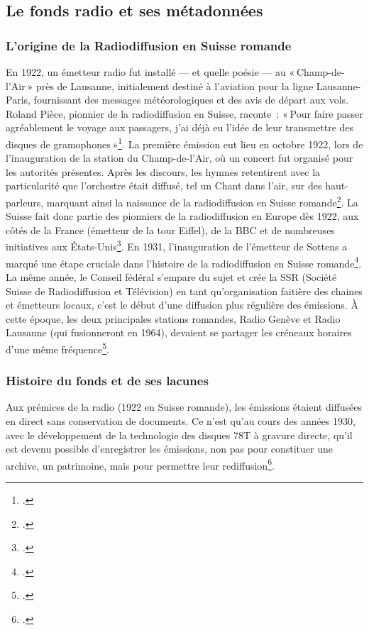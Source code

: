\subsection{Le fonds radio et ses métadonnées}
\subsubsection{L'origine de la Radiodiffusion en Suisse romande}

En 1922, un émetteur radio fut installé — et quelle poésie — au « Champ-de-l’Air » près de Lausanne, initialement destiné à l’aviation pour la ligne Lausanne-Paris, fournissant des messages météorologiques et des avis de départ aux vols. Roland Pièce, pionnier de la radiodiffusion en Suisse, raconte : « Pour faire passer agréablement le voyage aux passagers, j’ai déjà eu l’idée de leur transmettre des disques de gramophones »\footcite{1939}. La première émission eut lieu en octobre 1922, lors de l’inauguration de la station du Champ-de-l’Air, où un concert fut organisé pour les autorités présentes. Après les discours, les hymnes retentirent avec la particularité que l’orchestre était diffusé, tel un Chant dans l’air, sur des haut-parleurs, marquant ainsi la naissance de la radiodiffusion en Suisse romande\footcite{1939}. La Suisse fait donc partie des pionniers de la radiodiffusion en Europe dès 1922, aux côtés de la France (émetteur de la tour Eiffel), de la BBC et de nombreuses initiatives aux États-Unis\footcite{2022a}. 
En 1931, l’inauguration de l’émetteur de Sottens a marqué une étape cruciale dans l’histoire de la radiodiffusion en Suisse romande\footcite{zotero-256}. La même année, le Conseil fédéral s’empare du sujet et crée la SSR (Société Suisse de Radiodiffusion et Télévision) en tant qu’organisation faitière des chaines et émetteurs locaux, c’est le début d’une diffusion plus régulière des émissions. À cette époque, les deux principales stations romandes, Radio Genève et Radio Lausanne (qui fusionneront en 1964), devaient se partager les créneaux horaires d'une même fréquence\footcite{2022a}.

\subsubsection{Histoire du fonds et de ses lacunes}


Aux prémices de la radio (1922 en Suisse romande), les émissions étaient diffusées en direct sans conservation de documents. Ce n’est qu’au cours des années 1930, avec le développement de la technologie des disques 78T à gravure directe, qu’il est devenu possible d’enregistrer les émissions, non pas pour constituer une archive, un patrimoine, mais pour permettre leur rediffusion\footcite[p. 26]{prongue2009}.

